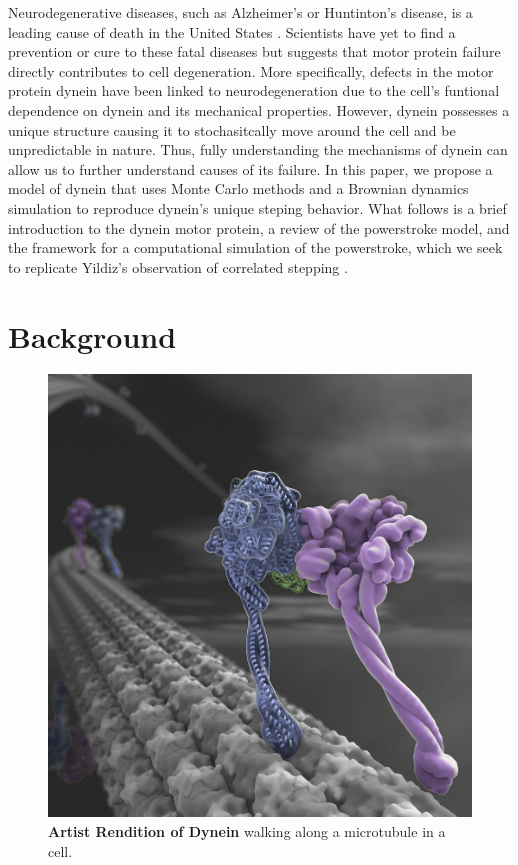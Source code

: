 
	Neurodegenerative diseases, such as Alzheimer's or Huntinton's disease, is a leading cause of death in the United States \cite{eschbach2011cytoplasmic}. Scientists have yet to find a prevention or cure to these fatal diseases but suggests that motor protein failure directly contributes to cell degeneration. More specifically, defects in the motor protein dynein have been linked to neurodegeneration due to the cell's funtional dependence on dynein and its mechanical properties. However, dynein possesses a unique structure causing it to stochasitcally move around the cell and be unpredictable in nature. Thus, fully understanding the mechanisms of dynein can allow us to further understand causes of its failure. In this paper, we propose a model of dynein that uses Monte Carlo methods and a Brownian dynamics simulation to reproduce dynein's unique steping behavior. What follows is a brief introduction to the dynein motor protein, a review of the powerstroke model, and the framework for a computational simulation of the powerstroke, which we seek to replicate Yildiz's observation of correlated stepping \cite{Dewitt2012}.  

\section{Background}

\begin{figure}[H]
	\centering
	\includegraphics[width=0.3\columnwidth]{Figures/dynein_walking_art.jpg}
	\caption[Artist Rendition of Dynein]{\textbf{Artist Rendition of Dynein} walking along a microtubule in a cell. \cite{JohnsonArt}}
	\label{fig:ArtDynein}
\end{figure}

